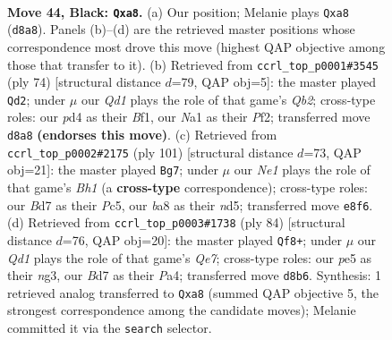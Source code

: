 \documentclass[11pt]{article}
\begin{document}
\clearpage

\begin{figure}[p]\centering
\begin{subfigure}{0.46\textwidth}\centering
\resizebox{\linewidth}{!}{%
\newchessgame
\chessboard[
  setfen={B2qn3/3b2k1/pP6/4Pp1p/3P2p1/N1Q5/5PPP/n3K1N1 b - - 0 44},
  showmover=false,
  pgfstyle=straightmove, color=movearrow, markmove={d8-a8}
]}
\caption{}
\end{subfigure}\hfill
\begin{subfigure}{0.46\textwidth}\centering
\resizebox{\linewidth}{!}{%
\newchessgame
\chessboard[
  setfen={6k1/2qn1pp1/4p1p1/p7/1n4P1/1P2PN1P/1Q3P2/5BK1 w - - 0 38},
  showmover=false,
  pgfstyle=straightmove, color=movearrow, markmove={b2-d2}
]}
\caption{}
\end{subfigure}
\\[4pt]
\begin{subfigure}{0.46\textwidth}\centering
\resizebox{\linewidth}{!}{%
\newchessgame
\chessboard[
  setfen={7b/5q1k/p2p2p1/2pN1n1p/2P1QP2/1P5P/P4BK1/8 b - - 6 51},
  showmover=false,
  pgfstyle=straightmove, color=movearrow, markmove={h8-g7}
]}
\caption{}
\end{subfigure}\hfill
\begin{subfigure}{0.46\textwidth}\centering
\resizebox{\linewidth}{!}{%
\newchessgame
\chessboard[
  setfen={8/1p2Q3/5ppk/p2P3p/P4q2/5NnP/1P4P1/6K1 w - - 2 43},
  showmover=false,
  pgfstyle=straightmove, color=movearrow, markmove={e7-f8}
]}
\caption{}
\end{subfigure}
\caption{\textbf{Move 44, Black: \texttt{Qxa8}.} (a) Our position; Melanie plays \texttt{Qxa8} (\texttt{d8a8}). Panels (b)--(d) are the retrieved master positions whose correspondence most drove this move (highest QAP objective among those that transfer to it). (b) Retrieved from \texttt{ccrl\_top\_p0001\#3545} (ply 74) [structural distance $d$=79, QAP obj=5]: the master played \texttt{Qd2}; under $\mu$ our \emph{Qd1} plays the role of that game's \emph{Qb2}; cross-type roles: our \emph{p}d4 as their \emph{B}f1, our \emph{N}a1 as their \emph{P}f2; transferred move \texttt{d8a8} \textbf{(endorses this move)}. (c) Retrieved from \texttt{ccrl\_top\_p0002\#2175} (ply 101) [structural distance $d$=73, QAP obj=21]: the master played \texttt{Bg7}; under $\mu$ our \emph{Ne1} plays the role of that game's \emph{Bh1} (a \textbf{cross-type} correspondence); cross-type roles: our \emph{B}d7 as their \emph{P}c5, our \emph{b}a8 as their \emph{n}d5; transferred move \texttt{e8f6}. (d) Retrieved from \texttt{ccrl\_top\_p0003\#1738} (ply 84) [structural distance $d$=76, QAP obj=20]: the master played \texttt{Qf8+}; under $\mu$ our \emph{Qd1} plays the role of that game's \emph{Qe7}; cross-type roles: our \emph{p}e5 as their \emph{n}g3, our \emph{B}d7 as their \emph{P}a4; transferred move \texttt{d8b6}. Synthesis: 1 retrieved analog transferred to \texttt{Qxa8} (summed QAP objective 5, the strongest correspondence among the candidate moves); Melanie committed it via the \texttt{search} selector.}
\label{fig:thought-m87}
\end{figure}
\end{document}
